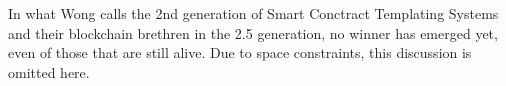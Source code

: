 \documentclass[conference]{IEEEtran}
\begin{document}
In what Wong calls the 2nd generation of Smart Conctract Templating Systems and their blockchain brethren in the 2.5 generation, no winner has emerged yet, even of those that are still alive. Due to space constraints, this discussion is omitted here.
\end{document}
